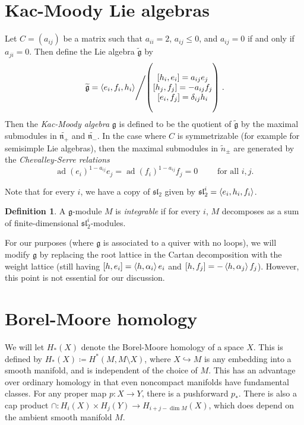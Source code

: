\documentclass{amsart}
\theoremstyle{definition}
\newtheorem{defn}[thm]{Definition}
\theoremstyle{remark}
\theoremstyle{plain}
\theoremstyle{definition}
\theoremstyle{remark}
\newcommand{\g}{\mathfrak{g}}
\newcommand{\mf}[1]{\mathfrak{#1}}
\newcommand{\wt}[1]{\widetilde{#1}}
\newcommand{\1}{\mathbf{1}}
\newcommand{\2}{\mathbf{2}}
\newcommand{\3}{\mathbf{3}}
\DeclareMathOperator{\ad}{ad}
\begin{document}
\section{Kac-Moody Lie algebras}

Let $C = (a_{ij})$ be a matrix such that $a_{ii} = 2$, $a_{ij} \leq 0$, and $a_{ij} = 0$ if and only if $a_{ji} = 0$. Then define the Lie algebra $\wt{\g}$ by
\[ \left. \wt{\mf{g}} = \ev{e_i,
f_i, h_i} \middle/ \qty( \Vectorstack{ {[h_i, e_i] = a_{ij} e_j} {[h_j, f_j] =
-a_{ij} f_j} {[e_i, f_j] = \delta_{ij} h_i} } ) \right. . \]
Then the \textit{Kac-Moody algebra} $\g$ is defined to be the quotient of $\wt{\g}$ by the maximal submodules in $\wt{\mf{n}_+}$ and $\wt{\mf{n}_-}$. In the case where $C$ is symmetrizable (for example for semisimple Lie algebras), then the maximal submodules in $\wt{n}_{\pm}$ are generated by the \textit{Chevalley-Serre relations}
\[ \ad(e_i)^{1-a_{ij}} e_j = \ad(f_i)^{1-a_{ij}} f_j = 0 \qquad \text{ for all }i, j. \]

Note that for every $i$, we have a copy of $\mf{sl}_2$ given by $\mf{sl}_2^i = \ev{e_i, h_i, f_i}$.

\begin{defn}
    A $\g$-module $M$ is \textit{integrable} if for every $i$, $M$ decomposes as a sum of finite-dimensional $\mf{sl}_2^i$-modules.
\end{defn}

For our purposes (where $\g$ is associated to a quiver with no loops), we will modify $\g$ by replacing the root lattice in the Cartan decomposition with the weight lattice (still having $[h, e_i] = \ev{h, \alpha_i} e_i$ and $[h, f_j] = -\ev{h, \alpha_j} f_j$). However, this point is not essential for our discussion.

\section{Borel-Moore homology}

We will let $H_*(X)$ denote the Borel-Moore homology of a space $X$. This is defined by $H_*(X) \coloneqq H^*(M, M \setminus X)$, where $X \hookrightarrow M$ is any embedding into a smooth manifold, and is independent of the choice of $M$. This has an advantage over ordinary homology in that even noncompact manifolds have fundamental classes. For any proper map $p \colon X \to Y$, there is a pushforward $p_*$. There is also a cap product $\cap \colon H_i(X) \times H_j(Y) \to H_{i+j-\dim M}(X)$, which does depend on the ambient smooth manifold $M$.
\end{document}
